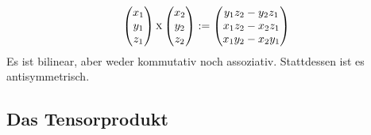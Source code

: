 \begin{example}
\begin{enumerate}[start=4]
     \[\begin{pmatrix}x_1\\y_1\\z_1\end{pmatrix} \textsc{x} \begin{pmatrix}x_2\\y_2\\z_2\end{pmatrix} := \begin{pmatrix}
     y_1 z_2 - y_2 z_1 \\
     x_1 z_2 - x_2 z_1 \\
     x_1 y_2 - x_2 y_1
     \end{pmatrix}\]
     Es ist bilinear, aber weder kommutativ noch assoziativ. Stattdessen ist es antisymmetrisch.
\end{enumerate}
\end{example}

\subsection{Das Tensorprodukt}

